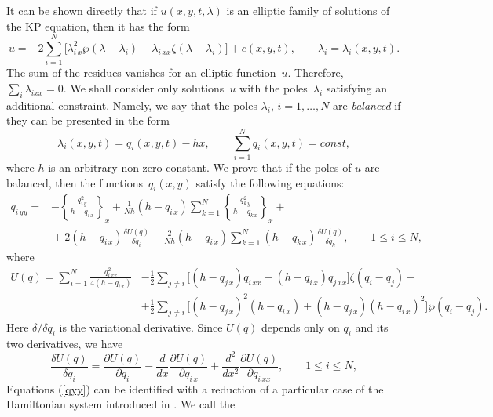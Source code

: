 \documentclass[a4paper,11pt]{article}
\newcommand{\p}{\partial}
\theoremstyle{plain}
\theoremstyle{remark}
\begin{document}
It can be shown directly that if $u(x,y,t,\lambda)$ is an elliptic
family of solutions of the KP equation, then it has the form
\begin{equation}\label{ukp}
u=-2 \sum_{i=1}^N \bigl[ \lambda_{i\,x}^2\wp(\lambda-\lambda_i) -
\lambda_{i\,xx}\zeta(\lambda-\lambda_i) \bigr] +
c(x,y,t),\qquad \lambda_i=\lambda_i(x,y,t).
\end{equation}
The sum of the residues vanishes for an elliptic function~$u$.
Therefore, $\sum_i\lambda_{ixx}=0$.
We shall consider only solutions~$u$ with the poles~$\lambda_i$
satisfying an additional constraint.
Namely, we say that the poles $\lambda_i$, $i=1,\ldots,N$
are \emph{balanced} if they can be presented in the form
\begin{equation}\label{bal}
\lambda_i(x,y,t)=q_i(x,y,t)-h x,\qquad
\sum_{i=1}^N q_i(x,y,t)=const ,
\end{equation}
where $h$ is an arbitrary non-zero constant.
We prove that if the poles of $u$ are balanced, then the functions~$q_i(x,y)$
satisfy the following equations:
\begin{equation}\label{qyy}
\begin{aligned}
q_{i\,yy} = &-\left\{ \frac{q_{i\,y}^2}{h-q_{i\,x}} \right\}_{\! x}
 +\frac{1}{Nh}(h-q_{i\,x}) \sum_{k=1}^N \left\{ \frac{q_{k\,y}^2}{h-q_{k\,x}}
 \right\}_{\! x}+{}\\
&{}+2(h-q_{i\,x})\frac{\delta U(q)}{\delta q_i}-\frac{2}{Nh}(h-q_{i\,x})
\sum_{k=1}^N (h-q_{k\,x})\frac{\delta U(q)}{\delta q_k} ,
\qquad 1\le i\le N,
\end{aligned}
\end{equation}
where
\begin{equation}\label{U}
\begin{aligned}
U(q)=\sum_{i=1}^N \frac{q^2_{i\,xx}}{4(h-q_{i\,x})}
&-\frac{1}{2} \sum_{j\neq i} \bigl[ (h-q_{j\,x})q_{i\,xx}-(h-q_{i\,x})q_{j\,xx} \bigr]
\zeta(q_i-q_j)+{}\\
{}&+\frac{1}{2}\sum_{j\neq i}
\bigl[(h-q_{j\,x})^2(h-q_{i\,x})+(h-q_{j\,x})(h-q_{i\,x})^2 \bigr]\wp(q_i-q_j) .
\end{aligned}
\end{equation}
Here $\delta/\delta q_i$ is the variational derivative. Since $U(q)$ depends
only on $q_i$ and its two derivatives, we have
$$
\frac{\delta U(q)}{\delta q_i}=\frac{\p U(q)}{\p q_i}-
\frac{d}{dx}\frac{\p U(q)}{\p q_{i\,x}}+
\frac{d^2}{d x^2}\frac{\p U(q)}{\p q_{i\,xx}}, \qquad 1\le i\le N,
$$
Equations (\ref{qyy}) can be identified with a reduction of a particular
case of the Hamiltonian system introduced in \cite{krvb}. We call the
\end{document}
